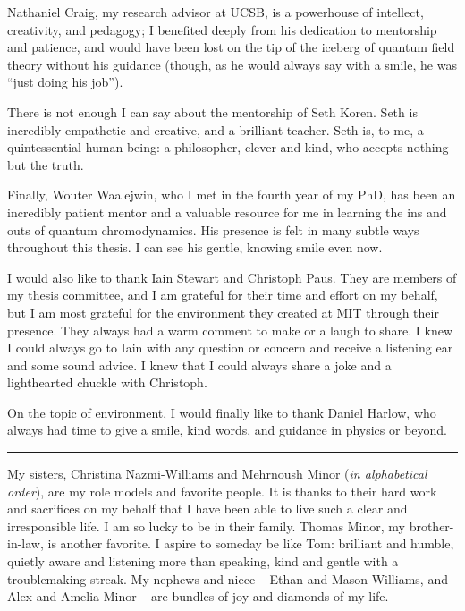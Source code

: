 Nathaniel Craig, my research advisor at UCSB, is a powerhouse of intellect, creativity, and pedagogy;
%
I benefited deeply from his dedication to mentorship and patience, and would have been lost on the tip of the iceberg of quantum field theory without his guidance (though, as he would always say with a smile, he was ``just doing his job'').



There is not enough I can say about the mentorship of Seth Koren.
%
Seth is incredibly empathetic and creative, and a brilliant teacher.
%
Seth is, to me, a quintessential human being:
%
a philosopher, clever and kind, who accepts nothing but the truth.



Finally, Wouter Waalejwin, who I met in the fourth year of my PhD, has been an incredibly patient mentor and a valuable resource for me in learning the ins and outs of quantum chromodynamics.
%
His presence is felt in many subtle ways throughout this thesis.
%
I can see his gentle, knowing smile even now.



I would also like to thank Iain Stewart and Christoph Paus.
%
They are members of my thesis committee, and I am grateful for their time and effort on my behalf, but I am most grateful for the environment they created at MIT through their presence.
%
They always had a warm comment to make or a laugh to share.
%
I knew I could always go to Iain with any question or concern and receive a listening ear and some sound advice.
%
I knew that I could always share a joke and a lighthearted chuckle with Christoph.


On the topic of environment, I would finally like to thank Daniel Harlow, who always had time to give a smile, kind words, and guidance in physics or beyond.


\vspace{12pt}
\hrule
\vspace{12pt}


My sisters, Christina Nazmi-Williams and Mehrnoush Minor (\textit{in alphabetical order}), are my role models and favorite people.
%
It is thanks to their hard work and sacrifices on my behalf that I have been able to live such a clear and irresponsible life.
%
I am so lucky to be in their family.
%
Thomas Minor, my brother-in-law, is another favorite.
%
I aspire to someday be like Tom:
%
brilliant and humble, quietly aware and listening more than speaking, kind and gentle with a troublemaking streak.
%
My nephews and niece -- Ethan and Mason Williams, and Alex and Amelia Minor -- are bundles of joy and diamonds of my life.



